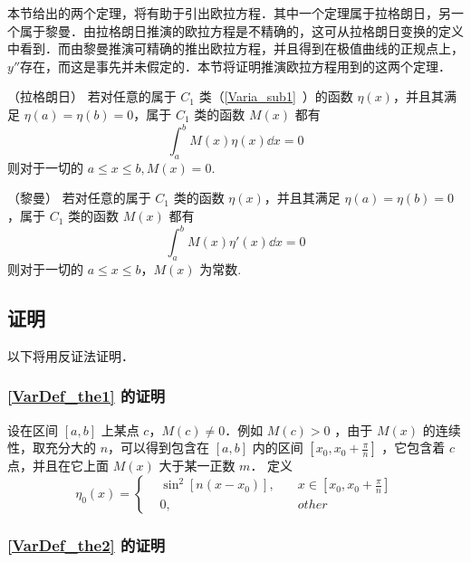 
\begin{issues}
\issueTODO
\end{issues}

本节给出的两个定理，将有助于引出欧拉方程．其中一个定理属于拉格朗日，另一个属于黎曼．由拉格朗日推演的欧拉方程是不精确的，这可从拉格朗日变换的定义中看到．而由黎曼推演可精确的推出欧拉方程，并且得到在极值曲线的正规点上，$y''$存在，而这是事先并未假定的．本节将证明推演欧拉方程用到的这两个定理．

\begin{theorem}{（拉格朗日）}\label{VarDef_the1}
若对任意的属于 $C_1$ 类（\autoref{Varia_sub1}~）的函数 $\eta(x)$，并且其满足 $\eta(a)=\eta(b)=0$，属于 $C_1$ 类的函数 $M(x)$ 都有
\begin{equation}
\int_a^b M(x)\eta(x)\dd x=0
\end{equation}
则对于一切的 $a\leq x\leq b,M(x)=0$.
\end{theorem}
\begin{theorem}{（黎曼）}\label{VarDef_the2}
若对任意的属于 $C_1$ 类的函数 $\eta(x)$，并且其满足 $\eta(a)=\eta(b)=0$，属于 $C_1$ 类的函数 $M(x)$ 都有
\begin{equation}
\int_a^b M(x)\eta'(x)\dd x=0
\end{equation}
则对于一切的 $a\leq x\leq b$，$M(x)$ 为常数.
\end{theorem}
\subsection{证明}
以下将用反证法证明．
\subsubsection{\autoref{VarDef_the1} 的证明}
设在区间 $[a,b]$  上某点 $c$，$M(c)\neq0$．例如 $M(c)>0$ ，由于 $M(x)$ 的连续性，取充分大的 $n$，可以得到包含在 $[a,b]$ 内的区间 $[x_0,x_0+\frac{\pi}{n}]$ ，它包含着 $c$ 点，并且在它上面 $M(x)$ 大于某一正数 $m$．
定义
\begin{equation}
\eta_0(x)=\begin{cases}
&\sin^2[n(x-x_0)],\quad &x\in[x_0,x_0+\frac{\pi}{n}]\\
&0,\quad &other
\end{cases}
\end{equation}

\subsubsection{\autoref{VarDef_the2} 的证明}